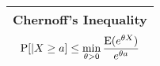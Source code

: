 \tabulinesep=1mm
\begin{tabu}{|p{16cm} |}
\hline
\vspace{2 mm}
\textbf{Chernoff's Inequality } \newline
\[\text{P}[|X \geq a] \leq \min_{\theta > 0} \frac{\text{E}(e^{\theta X})}{e^{\theta a}}\]
\vspace{2 mm}
\\
\hline
\end{tabu}